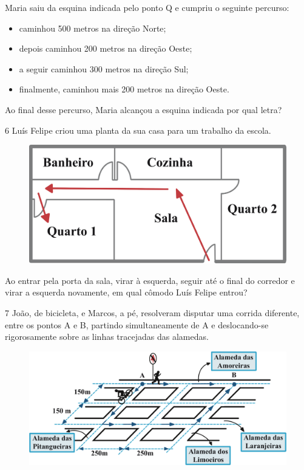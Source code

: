 Maria saiu da esquina indicada pelo ponto Q e cumpriu o seguinte
percurso:

\begin{itemize}
  \item caminhou 500 metros na direção Norte;

  \item depois caminhou 200 metros na direção Oeste;
  
  \item a seguir caminhou 300 metros na direção Sul;
  
  \item finalmente, caminhou mais 200 metros na direção Oeste.
\end{itemize}

Ao final desse percurso, Maria alcançou a esquina indicada por qual letra?


\num{6} Luís Felipe criou uma planta da sua casa para um trabalho da escola.

\begin{figure}[htpb!]
\centering
\includegraphics[width=.6\textwidth]{./ilustras-mat/modulo_12-atividade_6_resposta.png}
\end{figure}

\pagebreak
Ao entrar pela porta da sala, virar à esquerda, seguir até o final do
corredor e virar a esquerda novamente, em qual cômodo Luís Felipe entrou?


\num{7} João, de bicicleta, e Marcos, a pé, resolveram disputar uma corrida diferente, 
entre os pontos A e B, partindo simultaneamente de A e deslocando-se
rigorosamente sobre as linhas tracejadas das alamedas.

\begin{figure}[htpb!]
\centering
\includegraphics[width=.7\textwidth]{./ilustras-mat/modulo_12-atividade_7.png}
\end{figure}

